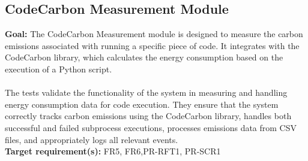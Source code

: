 \documentclass[12pt, titlepage]{article}
\begin{document}
  \subsection{CodeCarbon Measurement Module}
  \textbf{Goal:} The CodeCarbon Measurement module is designed to
  measure the carbon emissions associated with running a specific
  piece of code. It integrates with the CodeCarbon library, which
  calculates the energy consumption based on the execution of a
  Python script.\\ \\
  \noindent The tests validate the functionality of the system in
  measuring and handling energy consumption data for code execution.
  They ensure that the system correctly tracks carbon emissions using
  the CodeCarbon library, handles both successful and failed
  subprocess executions, processes emissions data from CSV files, and
  appropriately logs all relevant events.\\

  \noindent \textbf{Target requirement(s):} FR5, FR6,PR-RFT1,
  PR-SCR1~\cite{SRS} \\
\end{document}
